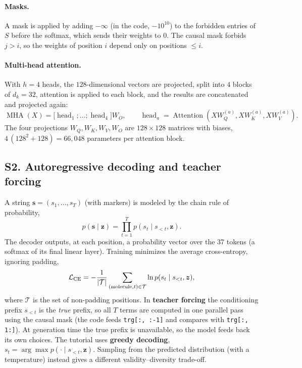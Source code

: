 \documentclass[11pt]{article}
\begin{document}
\paragraph{Masks.} A mask is applied by adding $-\infty$ (in the code, $-10^{10}$) to the forbidden entries of $S$ before the softmax, which sends their weights to $0$. The causal mask forbids $j>i$, so the weights of position $i$ depend only on positions $\le i$.

\paragraph{Multi-head attention.} With $h=4$ heads, the $128$-dimensional vectors are projected, split into $4$ blocks of $d_k=32$, attention is applied to each block, and the results are concatenated and projected again:
\[
  \operatorname{MHA}(X)=\big[\operatorname{head}_1;\dots;\operatorname{head}_4\big]W_O,\qquad
  \operatorname{head}_a=\operatorname{Attention}(XW_Q^{(a)},XW_K^{(a)},XW_V^{(a)}) .
\]
The four projections $W_Q,W_K,W_V,W_O$ are $128\times128$ matrices with biases, $4\,(128^2+128)=66{,}048$ parameters per attention block.

\label{sec:S2}
\subsection*{S2. Autoregressive decoding and teacher forcing}
A string $\bm s=(s_1,\dots,s_T)$ (with markers) is modeled by the chain rule of probability,
\[
  p(\bm s\mid\bm z)=\prod_{t=1}^{T}p(s_t\mid s_{<t},\bm z).
\]
The decoder outputs, at each position, a probability vector over the 37 tokens (a softmax of its final linear layer). Training minimizes the average cross-entropy, ignoring padding,
\[
  \mathcal L_{\rm CE}=-\frac1{|\mathcal T|}\sum_{(\text{molecule},t)\in\mathcal T}\ln p(s_t\mid s_{<t},\bm z),
\]
where $\mathcal T$ is the set of non-padding positions. In \textbf{teacher forcing} the conditioning prefix $s_{<t}$ is the \emph{true} prefix, so all $T$ terms are computed in one parallel pass using the causal mask (the code feeds \texttt{trg[:, :-1]} and compares with \texttt{trg[:, 1:]}). At generation time the true prefix is unavailable, so the model feeds back its own choices. The tutorial uses \textbf{greedy decoding}, $s_t=\arg\max p(\cdot\mid s_{<t},\bm z)$. Sampling from the predicted distribution (with a temperature) instead gives a different validity--diversity trade-off.

\label{sec:S3}
\end{document}
